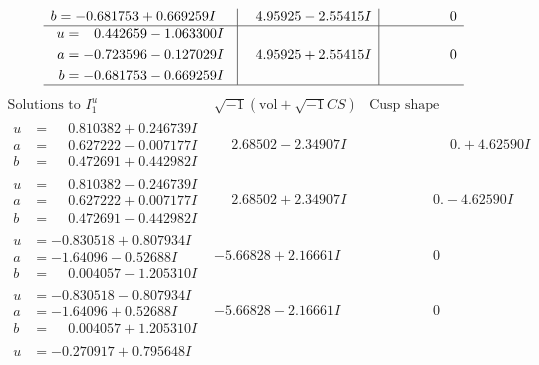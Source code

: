 \documentclass[1p]{elsarticle_modified}
\theoremstyle{definition}
\newcommand{\I}{\sqrt{-1}}
\begin{document}
$$\begin{array}{c|c|c}
\begin{aligned}
b &= -0.681753 + 0.669259 I\end{aligned}
 & \phantom{-}4.95925 - 2.55415 I & \phantom{-0.000000 } 0 \\ \hline\begin{aligned}
u &= \phantom{-}0.442659 - 1.063300 I \\
a &= -0.723596 - 0.127029 I \\
b &= -0.681753 - 0.669259 I\end{aligned}
 & \phantom{-}4.95925 + 2.55415 I & \phantom{-0.000000 } 0\\
 \hline 
 \end{array}$$\newpage$$\begin{array}{c|c|c}  
\text{Solutions to }I^u_{1}& \I (\text{vol} + \sqrt{-1}CS) & \text{Cusp shape}\\
 \hline 
\begin{aligned}
u &= \phantom{-}0.810382 + 0.246739 I \\
a &= \phantom{-}0.627222 - 0.007177 I \\
b &= \phantom{-}0.472691 + 0.442982 I\end{aligned}
 & \phantom{-}2.68502 - 2.34907 I & \phantom{-0.000000 -}0. + 4.62590 I \\ \hline\begin{aligned}
u &= \phantom{-}0.810382 - 0.246739 I \\
a &= \phantom{-}0.627222 + 0.007177 I \\
b &= \phantom{-}0.472691 - 0.442982 I\end{aligned}
 & \phantom{-}2.68502 + 2.34907 I & \phantom{-0.000000 } 0. - 4.62590 I \\ \hline\begin{aligned}
u &= -0.830518 + 0.807934 I \\
a &= -1.64096 - 0.52688 I \\
b &= \phantom{-}0.004057 - 1.205310 I\end{aligned}
 & -5.66828 + 2.16661 I & \phantom{-0.000000 } 0 \\ \hline\begin{aligned}
u &= -0.830518 - 0.807934 I \\
a &= -1.64096 + 0.52688 I \\
b &= \phantom{-}0.004057 + 1.205310 I\end{aligned}
 & -5.66828 - 2.16661 I & \phantom{-0.000000 } 0 \\ \hline\begin{aligned}
u &= -0.270917 + 0.795648 I \\

\end{aligned}
\end{array}$$
\end{document}
